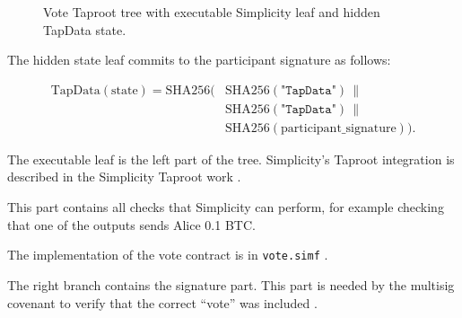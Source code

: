 \documentclass[11pt]{article}
\begin{document}
\begin{figure}[ht]
  \centering
  \caption{Vote Taproot tree with executable Simplicity leaf and hidden TapData state.}
\end{figure}

The hidden state leaf commits to the participant signature as follows:

\begin{equation}
\begin{aligned}
\mathrm{TapData(state)}
  = \mathrm{SHA256}(&
    \mathrm{SHA256}(\texttt{"TapData"}) \,\|\, \\
  &
    \mathrm{SHA256}(\texttt{"TapData"}) \,\|\, \\
  &
    \mathrm{SHA256}(\mathrm{participant\_signature})
  ).
\end{aligned}
\end{equation}

The executable leaf is the left part of the tree.
Simplicity's Taproot integration is described in the Simplicity Taproot work \cite{simplicity-taproot-universal-sighashes}.

This part contains all checks that Simplicity can perform, for example checking that one of the outputs sends Alice 0.1 BTC.

The implementation of the vote contract is in \texttt{vote.simf} \cite{native-multisig-vote}.

The right branch contains the signature part.
This part is needed by the multisig covenant to verify that the correct ``vote'' was included \cite{native-multisig-multisig}.
\end{document}
